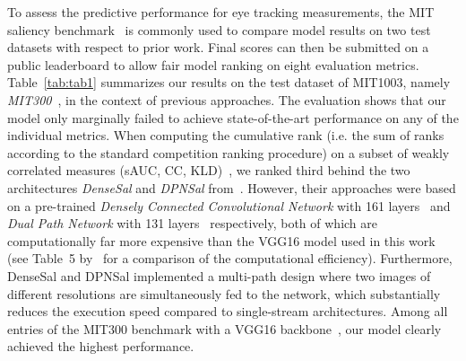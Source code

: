 \documentclass[final,1p,times,number]{elsarticle}
\begin{document}
To assess the predictive performance for eye tracking measurements, the MIT saliency benchmark~\cite{bylinskii2015saliency} is commonly used to compare model results on two test datasets with respect to prior work. Final scores can then be submitted on a public leaderboard to allow fair model ranking on eight evaluation metrics. Table~\ref{tab:tab1} summarizes our results on the test dataset of MIT1003, namely \textit{MIT300}~\cite{judd2012benchmark}, in the context of previous approaches. The evaluation shows that our model only marginally failed to achieve state-of-the-art performance on any of the individual metrics. When computing the cumulative rank (i.e. the sum of ranks according to the standard competition ranking procedure) on a subset of weakly correlated measures (sAUC, CC, KLD)~\cite{riche2013saliency,bylinskii2018different}, we ranked third behind the two architectures \textit{DenseSal} and \textit{DPNSal} from~\citet{oyama2018influence}. However, their approaches were based on a pre-trained \textit{Densely Connected Convolutional Network} with 161 layers~\cite{huang2017densely} and \textit{Dual Path Network} with 131 layers~\cite{chen2017dual} respectively, both of which are computationally far more expensive than the VGG16 model used in this work (see Table~5 by~\citet{oyama2018influence} for a comparison of the computational efficiency). Furthermore, DenseSal and DPNSal implemented a multi-path design where two images of different resolutions are simultaneously fed to the network, which substantially reduces the execution speed compared to single-stream architectures. Among all entries of the MIT300 benchmark with a VGG16 backbone~\cite{cornia2016deep,huang2015salicon,Cornia2018PredictingHE,kruthiventi2017deepfix}, our model clearly achieved the highest performance.
\end{document}
